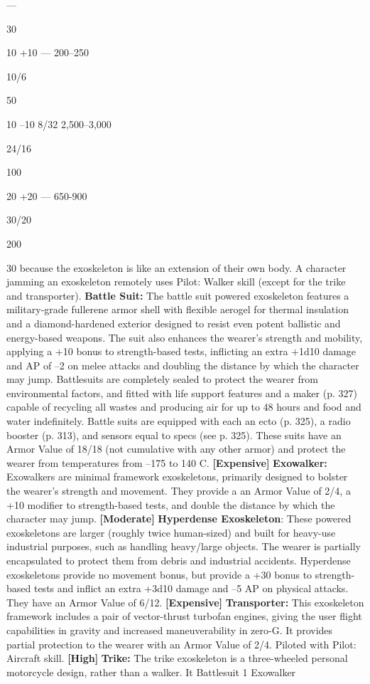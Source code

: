 —

30

10
+10
—
200–250

10/6

50

10
–10
8/32
2,500–3,000

24/16

100

20
+20
—
650-900

30/20

200

30
because the exoskeleton is like an extension of their 
own body. A character jamming an exoskeleton remotely
uses Pilot: Walker skill (except for the trike
and transporter).
\textbf{Battle Suit: }The battle suit powered exoskeleton
features a military-grade fullerene armor shell
with flexible aerogel for thermal insulation and a 
diamond-hardened exterior designed to resist even 
potent ballistic and energy-based weapons. The suit 
also enhances the wearer's strength and mobility, applying
a +10 bonus to strength-based tests, inflicting
an extra +1d10 damage and AP of –2 on melee attacks
and doubling the distance by which the character
may jump. Battlesuits are completely sealed to
protect the wearer from environmental factors, and 
fitted with life support features and a maker (p. 327) 
capable of recycling all wastes and producing air 
for up to 48 hours and food and water indefinitely. 
Battle suits are equipped with each an ecto (p. 325), 
a radio booster (p. 313), and sensors equal to specs 
(see p. 325). These suits have an Armor Value of 
18/18 (not cumulative with any other armor) and 
protect the wearer from temperatures from –175 to 
140 C. \textbf{[Expensive]}
\textbf{Exowalker:} Exowalkers are minimal framework 
exoskeletons, primarily designed to bolster the 
wearer's strength and movement. They provide a an 
Armor Value of 2/4, a +10 modifier to strength-based 
tests, and double the distance by which the character 
may jump. \textbf{[Moderate]}
\textbf{Hyperdense Exoskeleton}: These powered exoskeletons
are larger (roughly twice human-sized) and built
for heavy-use industrial purposes, such as handling 
heavy/large objects. The wearer is partially encapsulated 
to protect them from debris and industrial accidents. 
Hyperdense exoskeletons provide no movement bonus, 
but provide a +30 bonus to strength-based tests and 
inflict an extra +3d10 damage and –5 AP on physical 
attacks. They have an Armor Value of 6/12. \textbf{[Expensive]}
\textbf{Transporter:} This exoskeleton framework includes 
a pair of vector-thrust turbofan engines, giving the 
user flight capabilities in gravity and increased maneuverability
in zero-G. It provides partial protection to
the wearer with an Armor Value of 2/4. Piloted with 
Pilot: Aircraft skill. \textbf{[High]}
\textbf{Trike:} The trike exoskeleton is a three-wheeled 
personal motorcycle design, rather than a walker. It 
Battlesuit 1
Exowalker


